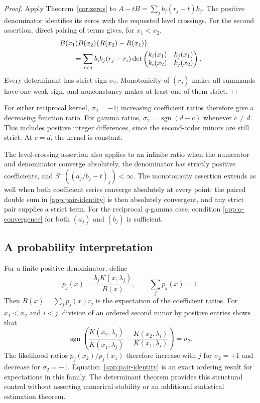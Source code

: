 \documentclass[11pt,a4paper]{article}
\theoremstyle{definition}
\theoremstyle{remark}
\DeclareMathOperator{\sgn}{sgn}
\begin{document}
\begin{proof}
Apply Theorem~\ref{cor:zeros} to
\(A-tB=\sum_j b_j(r_j-t)k_j\). The positive denominator identifies
its zeros with the requested level crossings.
For the second assertion, direct pairing of terms gives, for
\(x_1<x_2\),
\begin{align}\label{app:pair-identity}
 &B(x_1)B(x_2)\{R(x_2)-R(x_1)\}\notag\\
 &\qquad=\sum_{i<j}b_ib_j(r_j-r_i)
 \det\begin{pmatrix}k_i(x_1)&k_j(x_1)\\
 k_i(x_2)&k_j(x_2)\end{pmatrix}.
\end{align}
Every determinant has strict sign \(\sigma_2\). Monotonicity of
\((r_j)\) makes all summands have one weak sign, and nonconstancy
makes at least one of them strict.
\end{proof}

For either reciprocal kernel, \(\sigma_2=-1\); increasing
coefficient ratios therefore give a decreasing function ratio.
For gamma ratios, \(\sigma_2=\sgn(d-c)\) whenever \(c\ne d\).
This includes positive integer differences, since the second-order
minors are still strict. At \(c=d\), the kernel is constant.

The level-crossing assertion also applies to an infinite ratio when
the numerator and denominator converge absolutely, the denominator
has strictly positive coefficients, and
\(S^-((a_j/b_j-t)_j)<\infty\). The monotonicity assertion extends
as well when both coefficient series converge absolutely at every
point: the paired double sum in \eqref{app:pair-identity} is then
absolutely convergent, and any strict pair supplies a strict term.
For the reciprocal \(q\)-gamma case, condition
\eqref{app:q-convergence} for both \((a_j)\) and \((b_j)\) is
sufficient.

\subsection{A probability interpretation}

For a finite positive denominator, define
\[
 p_j(x)=\frac{b_jK(x,\lambda_j)}{B(x)},\qquad
 \sum_jp_j(x)=1.
\]
Then \(R(x)=\sum_jp_j(x)r_j\) is the expectation of the
coefficient ratios. For \(x_1<x_2\) and \(i<j\), division of an
ordered second minor by positive entries shows that
\[
 \sgn\left(
 \frac{K(x_2,\lambda_j)}{K(x_1,\lambda_j)}
 -\frac{K(x_2,\lambda_i)}{K(x_1,\lambda_i)}\right)=\sigma_2.
\]
The likelihood ratios \(p_j(x_2)/p_j(x_1)\) therefore increase
with \(j\) for \(\sigma_2=+1\) and decrease for \(\sigma_2=-1\).
Equation~\eqref{app:pair-identity} is an exact ordering result for
expectations in this family. The determinant theorem provides this
structural control without asserting numerical stability or an
additional statistical estimation theorem.
\end{document}
